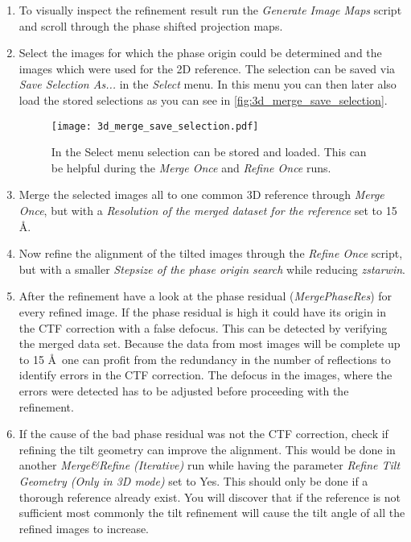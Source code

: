 \begin{enumerate}
	\item To visually inspect the refinement result run the \textit{Generate Image Maps} script and scroll through the phase shifted projection maps.
	\item Select the images for which the phase origin could be determined and the images which were used for the 2D reference. The selection can be saved via \textit{Save Selection As...} in the \textit{Select} menu. In this menu you can then later also load the stored selections as you can see in \autoref{fig:3d_merge_save_selection}.
		\begin{figure}[H]
		\centering
		\texttt{[image: 3d\_merge\_save\_selection.pdf]}
		\caption{In the Select menu selection can be stored and loaded. This can be helpful during the \textit{Merge Once}  and \textit{Refine Once} runs.}
		\label{fig:3d_merge_save_selection}
	\end{figure}
	\item Merge the selected images all to one common 3D reference through \textit{Merge Once}, but with a \textit{Resolution of the merged dataset for the reference} set to 15 \AA.
	\item Now refine the alignment of the tilted images through the \textit{Refine Once} script, but with a smaller \textit{Stepsize of the phase origin search} while reducing \textit{zstarwin}.
	\item After the refinement have a look at the phase residual (\textit{MergePhaseRes}) for every refined image. If the phase residual is high it could have its origin in the CTF correction with a false defocus. This can be detected by verifying the merged data set. Because the data from most images will be complete up to 15 \AA~one can profit from the redundancy in the number of reflections to identify errors in the CTF correction. The defocus in the images, where the errors were detected has to be adjusted before proceeding with the refinement. 
	\item If the cause of the bad phase residual was not the CTF correction, check if refining the tilt geometry can improve the alignment. This would be done in another \textit{Merge\&Refine (Iterative)} run while having the parameter \textit{Refine Tilt Geometry (Only in 3D mode)} set to Yes. This should only be done if a thorough reference already exist. You will discover that if the reference is not sufficient most commonly the tilt refinement will cause the tilt angle of all the refined images to increase.

\end{enumerate}
